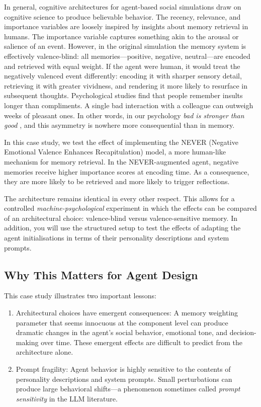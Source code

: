 In general, cognitive architectures for agent-based social simulations draw on cognitive science to produce believable behavior. The recency, relevance, and importance variables are loosely inspired by insights about memory retrieval in humans. The importance variable captures something akin to the arousal or salience of an event. However, in the original simulation \citep{park2022social} the memory system is effectively valence-blind: all memories---positive, negative, neutral---are encoded and retrieved with equal weight. If the agent were human, it would treat the negatively valenced event differently: encoding it with sharper sensory detail, retrieving it with greater vividness, and rendering it more likely to resurface in subsequent thoughts. Psychological studies find that people remember insults longer than compliments. A single bad interaction with a colleague can outweigh weeks of pleasant ones. In other words, in our psychology {\em bad is stronger than good} \citep{baumeister2001bad}, and this asymmetry is nowhere more consequential than in memory.

In this case study, we test the effect of implementing the NEVER (Negative Emotional Valence Enhances Recapitulation) model, a more human-like mechanism for memory retrieval. In the NEVER-augmented agent, negative memories receive higher importance scores at encoding time. As a consequence, they are more likely to be retrieved and more likely to trigger reflections. 

The architecture remains identical in every other respect. This allows for a controlled {\em machine-psychological} experiment in which the effects can be compared of an architectural choice: valence-blind versus valence-sensitive memory. In addition, you will use the structured setup to test the effects of adapting the agent initialisations in terms of their personality descriptions and system prompts. 

\subsection{Why This Matters for Agent Design}

This case study illustrates two important lessons:
\begin{enumerate}
    \item Architectural choices have emergent consequences: A memory weighting parameter that seems innocuous at the component level can produce dramatic changes in the agent's social behavior, emotional tone, and decision-making over time. These emergent effects are difficult to predict from the architecture alone.
    \item Prompt fragility: Agent behavior is highly sensitive to the contents of personality descriptions and system prompts. Small perturbations can produce large behavioral shifts---a phenomenon sometimes called \emph{prompt sensitivity} in the LLM literature.
\end{enumerate}


